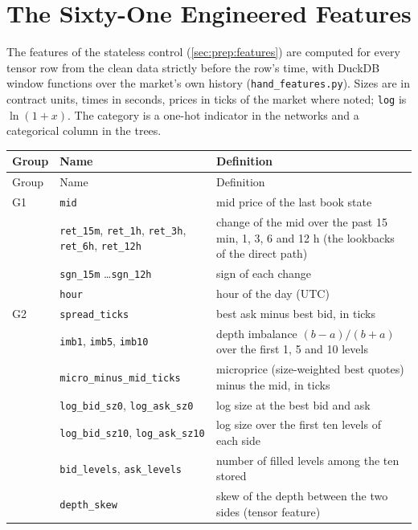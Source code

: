 \chapter{The Sixty-One Engineered Features}
\label{app:features}

The features of the stateless control (\cref{sec:prep:features}) are computed for every
tensor row from the clean data strictly before the row's time, with DuckDB window functions
over the market's own history (\texttt{hand\_features.py}).  Sizes are in contract units,
times in seconds, prices in ticks of the market where noted; \texttt{log} is $\ln(1 + x)$.
The category is a one-hot indicator in the networks and a categorical column in the trees.

\begin{footnotesize}
\begin{longtable}{llp{7.3cm}}
\toprule
Group & Name & Definition \\
\midrule
\endfirsthead
\toprule
Group & Name & Definition \\
\midrule
\endhead
\bottomrule
\endfoot
G1 & \texttt{mid} & mid price of the last book state \\
   & \texttt{ret\_15m}, \texttt{ret\_1h}, \texttt{ret\_3h}, \texttt{ret\_6h}, \texttt{ret\_12h} & change of the mid over the past 15 min, 1, 3, 6 and 12 h (the lookbacks of the direct path) \\
   & \texttt{sgn\_15m} \ldots \texttt{sgn\_12h} & sign of each change \\
   & \texttt{hour} & hour of the day (UTC) \\
\midrule
G2 & \texttt{spread\_ticks} & best ask minus best bid, in ticks \\
   & \texttt{imb1}, \texttt{imb5}, \texttt{imb10} & depth imbalance $(b - a)/(b + a)$ over the first 1, 5 and 10 levels \\
   & \texttt{micro\_minus\_mid\_ticks} & microprice (size-weighted best quotes) minus the mid, in ticks \\
   & \texttt{log\_bid\_sz0}, \texttt{log\_ask\_sz0} & log size at the best bid and ask \\
   & \texttt{log\_bid\_sz10}, \texttt{log\_ask\_sz10} & log size over the first ten levels of each side \\
   & \texttt{bid\_levels}, \texttt{ask\_levels} & number of filled levels among the ten stored \\
   & \texttt{depth\_skew} & skew of the depth between the two sides (tensor feature) \\

\end{longtable}
\end{footnotesize}
